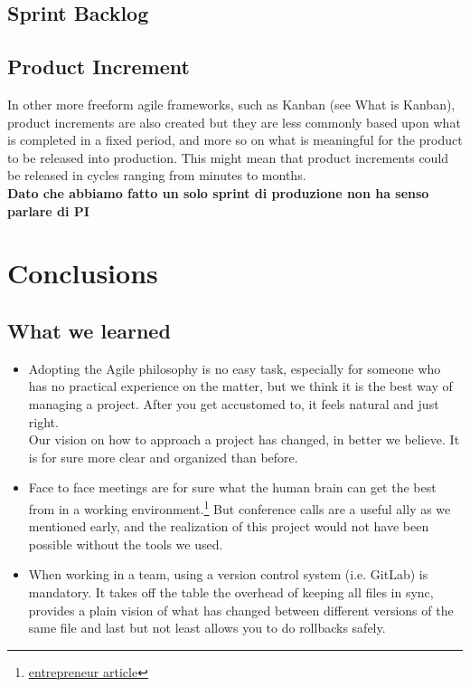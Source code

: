 \documentclass[a4paper,10pt]{report}
\begin{document}
\section{Sprint Backlog} %
\section{Product Increment} %
In other more freeform agile frameworks, such as Kanban (see What is Kanban), product increments are also created but they are less commonly based upon what is completed in a fixed period, and more so on what is meaningful for the product to be released into production. This might mean that product increments could be released in cycles ranging from minutes to months.\\
\textbf{Dato che abbiamo fatto un solo sprint di produzione non ha senso parlare di PI}
\chapter{Conclusions} %
\section{What we learned} %
\begin{itemize}
	
	\item Adopting the Agile philosophy is no easy task, especially for someone who has no practical experience on the matter, but we think it is the best way of managing a project. After you get accustomed to, it feels natural and just right.\\
	Our vision on how to approach a project has changed, in better we believe. It is for sure more clear and organized than before.
	\item Face to face meetings are for sure what the human brain can get the best from in a working environment.\footnote{\href{https://www.entrepreneur.com/article/296590}{entrepreneur article}} But conference calls are a useful ally as we mentioned early, and the realization of this project would not have been possible without the tools we used. 
	\item When working in a team, using a version control system (i.e. GitLab) is mandatory. It takes off the table the overhead of keeping all files in sync, provides a plain vision of what has changed between different versions of the same file and last but not least allows you to do rollbacks safely.
\end{itemize}
\end{document}
